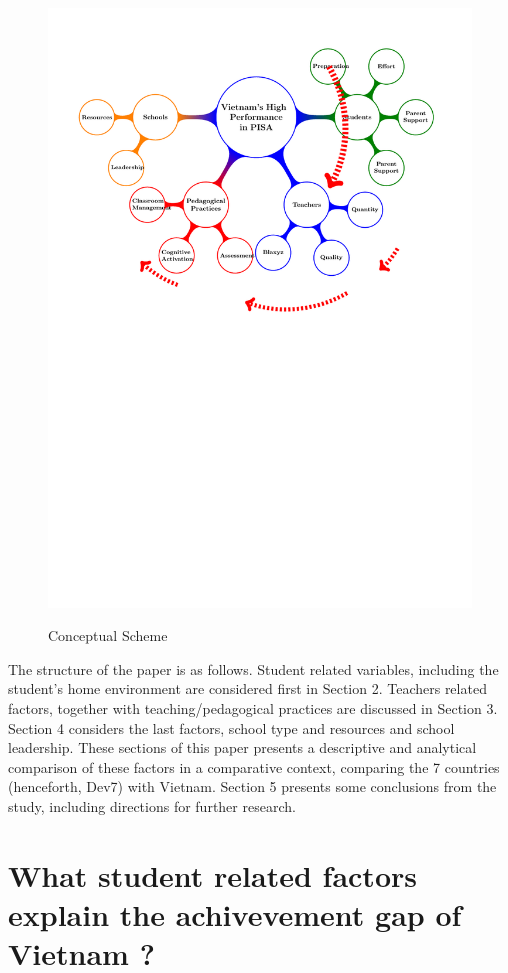 \documentclass[12pt]{article}%
\begin{document}
\begin{figure}[H]
   \caption{Conceptual Scheme}
   \centering 
     \includegraphics[width= 5in]{INTRTIKZ.pdf} \\
   \label{fig:m} 
\end{figure}

The structure of the paper is as follows. Student related variables, including the student's home environment are considered first in Section 2. Teachers related factors, together with teaching/pedagogical practices are discussed in Section 3. Section 4 considers the last factors, school type and resources and school leadership. These sections of this paper presents a descriptive and analytical comparison of these factors in a comparative context, comparing the 7 countries (henceforth, Dev7) with Vietnam. Section 5 presents some conclusions from the study, including directions for further research.
 
\section{What student related factors explain the achivevement gap of Vietnam ?}
\end{document}
